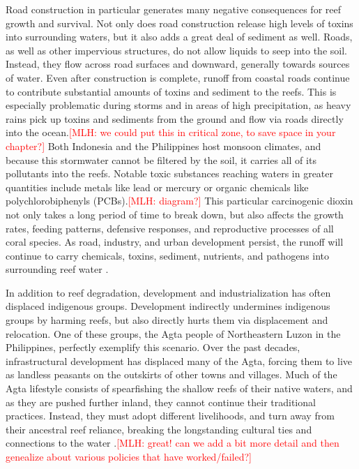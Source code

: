 \documentclass{book}\usepackage{knitr}
\newcommand{\red}[1]{\textcolor{red}{[MLH: #1]}}
\begin{document}
{Road construction in particular generates many negative consequences for reef growth and survival. Not only does road construction release high levels of toxins into surrounding waters, but it also adds a great deal of sediment as well. Roads, as well as other impervious structures, do not allow liquids to seep into the soil. Instead, they flow across road surfaces and downward, generally towards sources of water. Even after construction is complete, runoff from coastal roads continue to contribute substantial amounts of toxins and sediment to the reefs. This is especially problematic during storms and in areas of high precipitation, as heavy rains pick up toxins and sediments from the ground and flow via roads directly into the ocean.\red{we could put this in critical zone, to save space in your chapter?} Both Indonesia and the Philippines host monsoon climates, and because this stormwater cannot be filtered by the soil, it carries all of its pollutants into the reefs. Notable toxic substances reaching waters in greater quantities include metals like lead or mercury or organic chemicals like polychlorobiphenyls (PCBs).\red{diagram?} This particular carcinogenic dioxin not only takes a long period of time to break down, but also affects the growth rates, feeding patterns, defensive responses, and reproductive processes of all coral species. As road, industry, and urban development persist, the runoff will continue to carry chemicals, toxins, sediment, nutrients, and pathogens into surrounding reef water \citep{USEPA_2017}.

In addition to reef degradation, development and industrialization has often displaced indigenous groups. Development indirectly undermines indigenous groups by harming reefs, but also directly hurts them via displacement and relocation. One of these groups, the Agta people of Northeastern Luzon in the Philippines, perfectly exemplify this scenario. Over the past decades, infrastructural development has displaced many of the Agta, forcing them to live as landless peasants on the outskirts of other towns and villages. Much of the Agta lifestyle consists of spearfishing the shallow reefs of their native waters, and as they are pushed further inland, they cannot continue their traditional practices. Instead, they must adopt different livelihoods, and turn away from their ancestral reef reliance, breaking the longstanding cultural ties and connections to the water \citep{RePEc:gam:jsusta:v:12:y:2020:i:19:p:7983-:d:420111}.\red{great!  can we add a bit more detail and then genealize about various policies that have worked/failed?}

}
\end{document}
